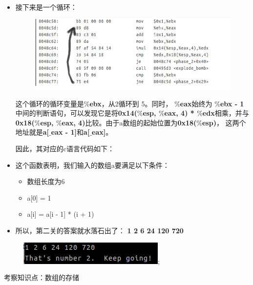\begin{itemize}
	\item
	接下来是一个循环：

	\begin{figure}[h]
		\centering
			\includegraphics[scale=0.77]{images/phase_2_part_1.png}
	\end{figure}
		
	这个循环的循环变量是\textbf{$\%$ebx}，从2循环到 5。同时， \textbf{$\%$eax}始终为
\textbf{$\%$ebx - 1}
	中间的判断语句，可以发现它是将\textbf{0x14($\%$esp, $\%$eax, 4) * $\%$edx}相乘，并与\textbf{0x18($\%$esp, $\%$eax, 4)}比较。由于a数组的起始位置为\textbf{0x18($\%$esp)}， 这两个地址就是\textbf{a[$\_$eax - 1]}和\textbf{a[$\_$eax]}。

	因此，其对应的c语言代码如下：

	
	
	\item
	这个函数表明，我们输入的数组a要满足以下条件：
	\begin{itemize}
		\item	数组长度为6
		\item	a[0] = 1
		\item	a[i] = a[i - 1] * (i + 1)
	\end{itemize}

	\item
	所以，第二关的答案就水落石出了： \textbf{1 2 6 24 120 720}
	
	\end{itemize}
	
	\begin{figure}[h]
		\centering
			\includegraphics[scale=0.8]{images/phase_2_success.png};
	\end{figure}
	考察知识点：数组的存储	